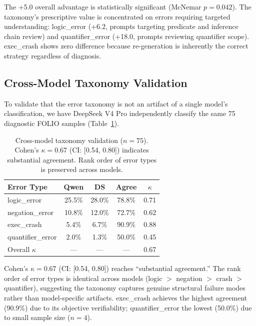 \documentclass[11pt,a4paper]{article}
\newcommand{\pp}{\text{pp}}
\begin{document}
The +5.0\pp{} overall advantage is statistically significant (McNemar $p\!=\!0.042$). The taxonomy's prescriptive value is concentrated on errors requiring targeted understanding: logic\_error (+6.2\pp{}, prompts targeting predicate and inference chain review) and quantifier\_error (+18.0\pp{}, prompts reviewing quantifier scope). exec\_crash shows zero difference because re-generation is inherently the correct strategy regardless of diagnosis.

\subsection{Cross-Model Taxonomy Validation}
\label{sec:taxonomy_validation}

To validate that the error taxonomy is not an artifact of a single model's classification, we have DeepSeek V4 Pro independently classify the same 75 diagnostic FOLIO samples (Table~\ref{tab:taxonomy_validation}).

\begin{table}[t]
\centering
\small
\begin{tabular}{lcccc}
\toprule
\textbf{Error Type} & \textbf{Qwen} & \textbf{DS} & \textbf{Agree} & $\kappa$ \\
\midrule
logic\_error & 25.5\% & 28.0\% & 78.8\% & 0.71 \\
negation\_error & 10.8\% & 12.0\% & 72.7\% & 0.62 \\
exec\_crash & 5.4\% & 6.7\% & 90.9\% & 0.88 \\
quantifier\_error & 2.0\% & 1.3\% & 50.0\% & 0.45 \\
\midrule
Overall $\kappa$ & --- & --- & --- & 0.67 \\
\bottomrule
\end{tabular}
\caption{Cross-model taxonomy validation ($n\!=\!75$). Cohen's $\kappa\!=\!0.67$ (CI: [0.54, 0.80]) indicates substantial agreement. Rank order of error types is preserved across models.}
\label{tab:taxonomy_validation}
\end{table}

Cohen's $\kappa\!=\!0.67$ (CI: [0.54, 0.80]) reaches ``substantial agreement.'' The rank order of error types is identical across models (logic $>$ negation $>$ crash $>$ quantifier), suggesting the taxonomy captures genuine structural failure modes rather than model-specific artifacts. exec\_crash achieves the highest agreement (90.9\%) due to its objective verifiability; quantifier\_error the lowest (50.0\%) due to small sample size ($n\!=\!4$).
\end{document}
